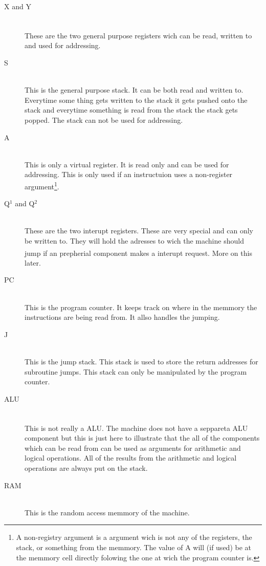 \documentclass{article}
\begin{document}
\begin{description}
  \item[X and Y] \hfill \\ 
  These are the two general purpose registers\textsuperscript{\cite{register}}
  wich can be read, written to and used for addressing.
  \item[S] \hfill \\
  This is the general purpose stack. It can be both read and
  written to. Everytime some thing gets written to the stack it gets pushed onto the
  stack and everytime something is read from the stack the stack gets popped.
  The stack can not be used for addressing.
  \item[A] \hfill \\
  This is only a virtual register. It is read only and can be used for
  addressing. This is only used if an instructuion uses a non-register
  argument\footnote{A non-registry argument is a argument wich is not any of
  the registers, the stack, or something from the memmory. The value of A will
  (if used) be at the memmory cell directly folowing the one at wich the
  program counter is.}.
  \item[Q$^1$ and Q$^2$] \hfill \\
  These are the two interupt registers. These are very special and can only be
  written to. They will hold the adresses to wich the machine should jump if an
  prepherial component makes a interupt request\textsuperscript{\cite{irq}}.
  More on this later.
  \item[PC]\hfill \\
  This is the program counter. It keeps track on where in the memmory the 
  instructions are being read from. It allso handles the jumping.
  \item[J]\hfill \\
  This is the jump stack. This stack is used to store the return addresses for
  subroutine jumps. This stack can only be manipulated by the program counter.
  \item[ALU]\hfill \\
  This is not really a ALU\textsuperscript{\cite{alu}}. The machine does not
  have a seppareta ALU component but this is just here to illustrate that the all of the components which can
  be read from can be used as arguments for arithmetic and logical operations.
  All of the results from the arithmetic and logical operations are always put
  on the stack.
  \item[RAM]\hfill \\
  This is the random access memmory of the machine.
\end{description}
\end{document}

